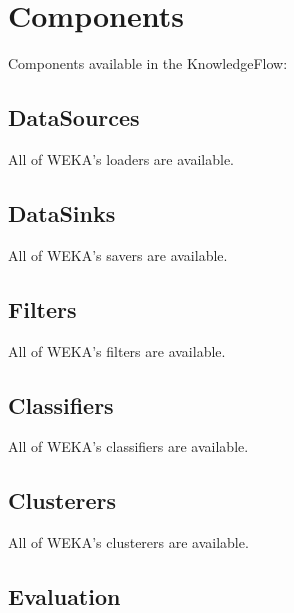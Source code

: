 \newpage
\section{Components}
Components available in the KnowledgeFlow:

\subsection{DataSources} All of WEKA's loaders are available.

\subsection{DataSinks} All of WEKA's savers are available.

\subsection{Filters} All of WEKA's filters are available.

\subsection{Classifiers} All of WEKA's classifiers are available.

\subsection{Clusterers} All of WEKA's clusterers are available.

\subsection{Evaluation}

